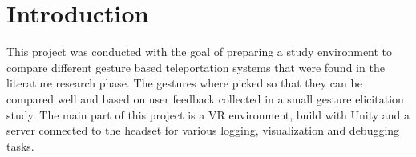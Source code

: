 
\chapter{Introduction}
This project was conducted with the goal of preparing a study environment to compare different gesture based teleportation systems that were found in the literature research phase. The gestures where picked so that they can be compared well and based on user feedback collected in a small gesture elicitation study. The main part of this project is a VR environment, build with Unity and a server connected to the headset for various logging, visualization and debugging tasks.
